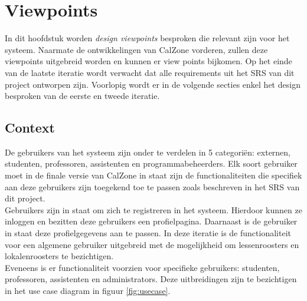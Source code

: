 \chapter{Viewpoints}
\label{chap:viewpoints}

In dit hoofdstuk worden \emph{design viewpoints} besproken die relevant zijn voor het systeem. 
Naarmate de ontwikkelingen van CalZone vorderen, zullen deze viewpoints uitgebreid worden en kunnen er view points bijkomen. 
Op het einde van de laatste iteratie wordt verwacht dat alle requirements uit het SRS van dit project ontworpen zijn. 
Voorlopig wordt er in de volgende secties enkel het design besproken van de eerste en tweede iteratie.

\section{Context}
\label{sec:context}

De gebruikers van het systeem zijn onder te verdelen in 5 categori\"{e}n: externen, studenten, professoren, assistenten en programmabeheerders. 
Elk soort gebruiker moet in de finale versie van CalZone in staat zijn de functionaliteiten die specifiek aan deze gebruikers zijn toegekend toe te passen zoals beschreven in het SRS van dit project. 
\\
Gebruikers zijn in staat om zich te registreren in het systeem. 
Hierdoor kunnen ze inloggen en bezitten deze gebruikers een profielpagina.
Daarnaast is de gebruiker in staat deze profielgegevens aan te passen.
In deze iteratie is de functionaliteit voor een algemene gebruiker uitgebreid met de mogelijkheid om lessenroosters en lokalenroosters te bezichtigen.
\\
Eveneens is er functionaliteit voorzien voor specifieke gebruikers: studenten, professoren, assistenten en administrators.
Deze uitbreidingen zijn te bezichtigen in het use case diagram in figuur \ref{fig:usecase}.

